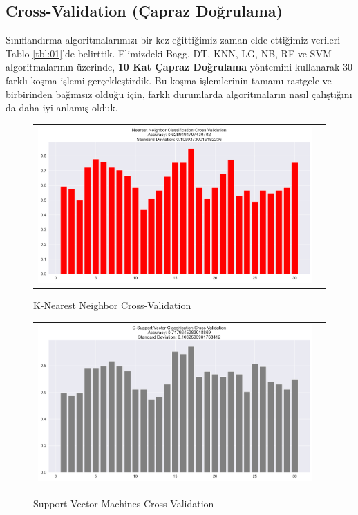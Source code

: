 \documentclass[conference]{IEEEtran}
\begin{document}
\pagebreak



\newpage
\subsection{\textbf{Cross-Validation (Çapraz Doğrulama)}}
\quad Sınıflandırma algoritmalarımızı bir kez eğittiğimiz zaman elde ettiğimiz verileri Tablo \ref{tbl:01}'de belirttik. Elimizdeki  Bagg, DT, KNN, LG, NB, RF ve SVM algoritmalarının üzerinde, \textbf{10 Kat Çapraz Doğrulama} yöntemini kullanarak 30 farklı koşma işlemi gerçekleştirdik. Bu koşma işlemlerinin tamamı rastgele ve birbirinden bağımsız olduğu için, farklı durumlarda algoritmaların nasıl çalıştığını da daha iyi anlamış olduk.

\begin{figure}[!h]
	\centering
	\begin{center}
		\begin{tabular}{cc}
			\includegraphics[scale=0.225]{pictures/pic_17.png}&
		\end{tabular}
	\end{center}
	\caption{K-Nearest Neighbor Cross-Validation}
	\label{fig:17}
\end{figure}

\begin{figure}[!h]
	\centering
	\begin{center}
		\begin{tabular}{cc}
			\includegraphics[scale=0.225]{pictures/pic_18.png}&
		\end{tabular}
	\end{center}
	\caption{Support Vector Machines Cross-Validation}
	\label{fig:18}
\end{figure}
\end{document}
